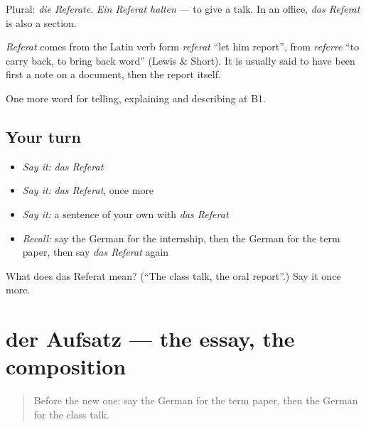 Plural: \emph{die Referate}. \emph{Ein Referat halten} — to give a talk. In an office, \emph{das Referat} is also a section.

\begin{cousinweb}
\emph{Referat} comes from the Latin verb form \emph{referat} \textquotedblleft{}let him report\textquotedblright{}, from \emph{referre} \textquotedblleft{}to carry back, to bring back word\textquotedblright{} (Lewis \& Short). It is usually said to have been first a note on a document, then the report itself.
\end{cousinweb}

\begin{grammarlens}[title={What you've built}]
One more word for telling, explaining and describing at B1.
\end{grammarlens}

\subsection*{Your turn}
\begin{itemize}
\raggedright
  \item \emph{Say it:} \emph{das Referat}
  \item \emph{Say it:} \emph{das Referat}, once more
  \item \emph{Say it:} a sentence of your own with \emph{das Referat}
  \item \emph{Recall:} say the German for the internship, then the German for the term paper, then say \emph{das Referat} again
\end{itemize}

\begin{tcolorbox}[breakable,colback=teal!4,colframe=teal!35!black,title={Before you move on}]
What does das Referat mean? (\textquotedblleft{}The class talk, the oral report\textquotedblright{}.) Say it once more.
\end{tcolorbox}
\section[der Aufsatz]{der Aufsatz — the essay, the composition}

\label{lesson:GE-C378-aufsatz}



\begin{quote}
Before the new one: say the German for the term paper, then the German for the class talk.
\end{quote}

